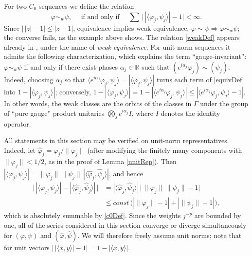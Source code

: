 \documentclass[twoside,11pt,letter]{article}
\def\bR{\mathbb{R}}
\theoremstyle{definition}
\theoremstyle{definition}
\theoremstyle{plain}
\newenvironment{remark}[1][Remark.]{\begin{trivlist}
\item[\hskip \labelsep {\bfseries #1}]}{\end{trivlist}}
\begin{document}
For two $C_0$-sequences we define the relation
\begin{equation}\label{weakDef}
\varphi\sim_w\psi,\quad\text{ if and only if }\quad\sum\,\big|\,|\langle \varphi_j,\psi_j\rangle|-1\big|<\infty.
\end{equation}
Since $\big|\,|z|-1\big|\leq|z-1|$, equivalence implies weak equivalence, $\varphi\sim\psi\Rightarrow\varphi\sim_w\psi$; the converse fails, as the example above shows. The relation \eqref{weakDef} appears already in \cite{vN39}, under the name of \emph{weak equivalence}. For unit-norm sequences it admits the following characterization, which explains the term ``gauge-invariant'': $\varphi\sim_w\psi$ if and only if there exist phases $\alpha_j\in\bR$ such that $(e^{i\alpha_j}\varphi_j)\sim(\psi_j)$. Indeed, choosing $\alpha_j$ so that $\langle e^{i\alpha_j}\varphi_j,\psi_j\rangle=|\langle\varphi_j,\psi_j\rangle|$ turns each term of \eqref{equivDef} into $1-|\langle\varphi_j,\psi_j\rangle|$; conversely, $1-|\langle\varphi_j,\psi_j\rangle|=1-|\langle e^{i\alpha_j}\varphi_j,\psi_j\rangle|\leq|\langle e^{i\alpha_j}\varphi_j,\psi_j\rangle-1|$. In other words, the weak classes are the orbits of the classes in $\Gamma$ under the group of ``pure gauge'' product unitaries $\bigotimes_j e^{i\alpha_j}I$, where $I$ denotes the identity operator.

\begin{remark}
All statements in this section may be verified on unit-norm representatives. Indeed, let $\hat\varphi_j=\varphi_j/\|\varphi_j\|$ (after modifying the finitely many components with $\|\varphi_j\|<1/2$, as in the proof of Lemma \ref{unitRep}). Then $|\langle\varphi_j,\psi_j\rangle|=\|\varphi_j\|\,\|\psi_j\|\,|\langle\hat\varphi_j,\hat\psi_j\rangle|$, and hence
\begin{equation*}
\begin{split}
\Big|\,|\langle\varphi_j,\psi_j\rangle|-|\langle\hat\varphi_j,\hat\psi_j\rangle|\,\Big|
&=|\langle\hat\varphi_j,\hat\psi_j\rangle|\,\big|\,\|\varphi_j\|\,\|\psi_j\|-1\big|\\
&\leq const\,\big(|\|\varphi_j\|-1|+|\|\psi_j\|-1|\big),
\end{split}
\end{equation*}
which is absolutely summable by \eqref{c0Def}. Since the weights $j^{-p}$ are bounded by one, all of the series considered in this section converge or diverge simultaneously for $(\varphi,\psi)$ and $(\hat\varphi,\hat\psi)$. We will therefore freely assume unit norms; note that for unit vectors $\big|\,|\langle x,y\rangle|-1\big|=1-|\langle x,y\rangle|$.
\end{remark}
\end{document}
